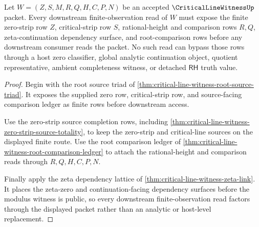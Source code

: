 \begin{theorem}
\label{thm:critical-line-witness-finite-observation-route}
Let $W=(Z,S,M,R,Q,H,C,P,N)$ be an accepted $\CriticalLineWitnessUp$ packet. Every downstream finite-observation read of $W$ must expose the finite zero-strip row $Z$, critical-strip row $S$, rational-height and comparison rows $R,Q$, zeta-continuation dependency surface, and root-comparison rows before any downstream consumer reads the packet. No such read can bypass those rows through a host zero classifier, global analytic continuation object, quotient representative, ambient completeness witness, or detached $\mathsf{RH}$ truth value.
\end{theorem}
\begin{proof}
Begin with the root source triad of \autoref{thm:critical-line-witness-root-source-triad}. It exposes the supplied zero row, critical-strip row, and source-facing comparison ledger as finite rows before downstream access.

Use the zero-strip source completion rows, including \autoref{thm:critical-line-witness-zero-strip-source-totality}, to keep the zero-strip and critical-line sources on the displayed finite route. Use the root comparison ledger of \autoref{thm:critical-line-witness-root-comparison-ledger} to attach the rational-height and comparison reads through $R,Q,H,C,P,N$.

Finally apply the zeta dependency lattice of \autoref{thm:critical-line-witness-zeta-link}. It places the zeta-zero and continuation-facing dependency surfaces before the modulus witness is public, so every downstream finite-observation read factors through the displayed packet rather than an analytic or host-level replacement.
\end{proof}

